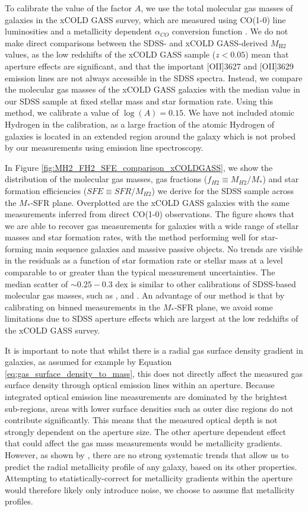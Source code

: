 \documentclass[fleqn,usenatbib]{mnras}
\begin{document}
To calibrate the value of the factor $A$, we use the total molecular gas masses of galaxies in the xCOLD GASS survey, which are measured using CO(1-0) line luminosities and a metallicity dependent $\alpha_{CO}$ conversion function \citep{saintonge2017}. We do not make direct comparisons between the SDSS- and xCOLD GASS-derived $M_{\textrm{H2}}$ values, as the low redshifts of the xCOLD GASS sample ($z<0.05$) mean that aperture effects are significant, and that the important [OII]3627 and [OII]3629 emission lines are not always accessible in the SDSS spectra. Instead, we compare the molecular gas masses of the xCOLD GASS galaxies with the median value in our SDSS sample at fixed stellar mass and star formation rate. Using this method, we calibrate a value of $\log(A) = 0.15$. We have not included atomic Hydrogen in the calibration, as a large fraction of the atomic Hydrogen of galaxies is located in an extended region around the galaxy which is not probed by our measurements using emission line spectroscopy.

In Figure \ref{fig:MH2_FH2_SFE_comparison_xCOLDGASS}, we show the distribution of the molecular gas masses, gas fractions ($f_{H2} \equiv M_{H2}/M_{\ast}$) and star formation efficiencies ($SFE \equiv SFR / M_{H2}$) we derive for the SDSS sample across the $M_{*}$-SFR plane. Overplotted are the xCOLD GASS galaxies with the same measurements inferred from direct CO(1-0) observations.  The figure shows that we are able to recover gas measurements for galaxies with a wide range of stellar masses and star formation rates, with the method performing well for star-forming main sequence galaxies and massive passive objects. No trends are visible in the residuals as a function of star formation rate or stellar mass at a level comparable to or greater than the typical measurement uncertainties. The median scatter of $\sim0.25-0.3$ dex is similar to other calibrations of SDSS-based molecular gas masses, such as \cite{concas2019}, \cite{yesuf2019} and \cite{piotrowska2020}. An advantage of our method is that by calibrating on binned measurements in the $M_{*}$-SFR plane, we avoid some limitations due to SDSS aperture effects which are largest at the low redshifts of the xCOLD GASS survey. 

It is important to note that whilst there is a radial gas surface density gradient in galaxies, as assumed for example by Equation \ref{eq:gas_surface_density_to_mass}, this does not directly affect the measured gas surface density through optical emission lines within an aperture. Because integrated optical emission line measurements are dominated by the brightest sub-regions, areas with lower surface densities such as outer disc regions do not contribute significantly. This means that the measured optical depth is not strongly dependent on the aperture size. The other aperture dependent effect that could affect the gas mass measurements would be metallicity gradients. However, as shown by \cite{lutz2021}, there are no strong systematic trends that allow us to predict the radial metallicity profile of any galaxy, based on its other properties. Attempting to statistically-correct for metallicity gradients within the aperture would therefore likely only introduce noise, we choose to assume flat metallicity profiles.
\end{document}
